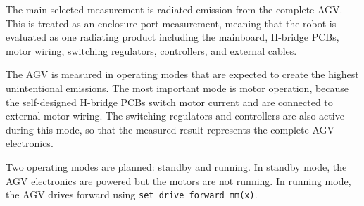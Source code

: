 The main selected measurement is radiated emission from the complete AGV. This is
treated as an enclosure-port measurement, meaning that the robot is evaluated as one
radiating product including the mainboard, H-bridge PCBs, motor wiring, switching
regulators, controllers, and external cables.

The AGV is measured in operating modes that are expected to create the highest
unintentional emissions. The most important mode is motor operation, because the
self-designed H-bridge PCBs switch motor current and are connected to external motor
wiring. The switching regulators and controllers are also active during this mode, so that
the measured result represents the complete AGV electronics.

Two operating modes are planned: standby and running. In standby mode, the AGV
electronics are powered but the motors are not running. In running mode, the AGV drives
forward using \texttt{set\_drive\_forward\_mm(x)}.

